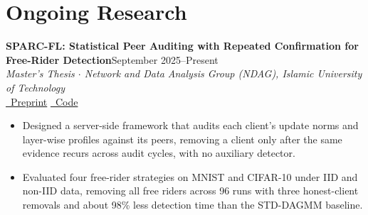 \documentclass[10pt,letterpaper]{article}
\newcommand{\entry}[3]{%
    \textbf{#1}\hfill #2\\[-1pt]
    #3
}
\newenvironment{cvitems}{%
    \begin{itemize}[
        leftmargin=13pt,
        topsep=2pt,
        itemsep=1pt,
        parsep=0pt,
        partopsep=0pt
    ]
}{\end{itemize}}
\begin{document}
\section{Ongoing Research}
\entry{SPARC-FL: Statistical Peer Auditing with Repeated Confirmation for Free-Rider Detection}{September 2025--Present}{%
    \textit{Master's Thesis $\cdot$ Network and Data Analysis Group (NDAG), Islamic University of Technology}\\[-1pt]
    \href{https://aashnan-rahman.github.io/academic-profile/Resources/Masters/masters_paper.pdf}{\faFile\ Preprint}
    \quad \href{https://github.com/Aashnan-Rahman/Mitigating-Free-Rider}{\faGithub\ Code}\\[-1pt]
    \begin{cvitems}
        \item Designed a server-side framework that audits each client's update norms and layer-wise profiles against its peers, removing a client only after the same evidence recurs across audit cycles, with no auxiliary detector.
        \item Evaluated four free-rider strategies on MNIST and CIFAR-10 under IID and non-IID data, removing all free riders across 96 runs with three honest-client removals and about 98\% less detection time than the STD-DAGMM baseline.
    \end{cvitems}
}
\end{document}
